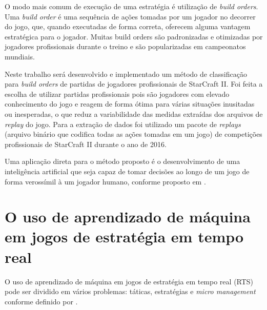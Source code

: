 O modo mais comum de execução de uma estratégia é utilização de \textit{build orders}. Uma \textit{build order} é uma sequência de ações tomadas por um jogador no decorrer do jogo, que, quando executadas de forma correta, oferecem alguma vantagem estratégica para o jogador. Muitas build orders são padronizadas e otimizadas por jogadores profissionais durante o treino e são popularizadas em campeonatos mundiais.

%

Neste trabalho será desenvolvido e implementado um método de classificação para \textit{build orders} de partidas de jogadores profissionais de StarCraft II. Foi feita a escolha de utilizar partidas profissionais pois são jogadores com elevado conhecimento do jogo e reagem de forma ótima para várias situações inusitadas ou inesperadas, o que reduz a variabilidade das medidas extraídas dos arquivos de \textit{replay} do jogo. Para a extração de dados foi utilizado um pacote de \textit{replays} (arquivo binário que codifica todas as ações tomadas em um jogo) de competições profissionais de StarCraft II durante o ano de 2016.


Uma aplicação direta para o método proposto é o desenvolvimento de uma inteligência artificial que seja capaz de tomar decisões ao longo de um jogo de forma verossímil à um jogador humano, conforme proposto em \cite{synnaeve2011bayesian1}.

		\section{O uso de aprendizado de máquina em jogos de estratégia em tempo real}
O uso de aprendizado de máquina em jogos de estratégia em tempo real (RTS) pode ser dividido em vários problemas: táticas, estratégias e \textit{micro management} conforme definido por \cite{synnaeve2011bayesian2}.

